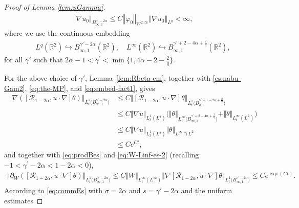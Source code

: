 \documentclass[reqno,11pt,a4paper]{amsart}
\begin{document}
\begin{proof}[Proof of Lemma \ref{lem:pGamma}]
\begin{align*}
  \left\Vert \nabla u_0\right\Vert _{ B_{\infty, 1}^{\gamma^{\prime}-2\alpha}}
  \leq C\left\Vert \varphi_0\right\Vert _{W^{2, \infty}}\left\Vert \nabla u_0\right\Vert _{L^q} <\infty,
\end{align*}
where we use the continuous embedding
\begin{align}\label{eq:embed-fact1}
  L^q(\mathbb{R}^2)\hookrightarrow B^{\gamma'-2\alpha}_{\infty,1}(\mathbb{R}^2),\quad
  L^\infty(\mathbb{R}^2)\hookrightarrow B^{\gamma'+2-4\alpha + \frac{2}{q}}_{\infty,1}(\mathbb{R}^2),
\end{align}
for all $\gamma'$ such that  $2\alpha-1<\gamma^{\prime}<
\min\{1,4\alpha-2-\frac{2}{q}\}$. 

For the above choice of $\gamma'$, Lemma~\ref{lem:Rbeta-cm},
together with \eqref{es:nabu-Gam2}, \eqref{eq:the-MP},
and \eqref{eq:embed-fact1}, gives
\begin{align}\label{eq:R-comm-Bes1}
  \left\Vert \nabla\left(\left[\mathcal{R}_{1-2\alpha}, u \cdot \nabla\right] \theta\right)
  \right\Vert _{L^1_t\big(B_{\infty, 1}^{\gamma^{\prime}-2\alpha}\big)}
  &\leq C \left\Vert \left[\mathcal{R}_{1-2\alpha}, u \cdot \nabla\right] \theta
  \right\Vert _{L^1_t\big(B_{q, 1}^{\gamma^{\prime}+1-2\alpha+\frac{2}{q}}\big)} \nonumber \\
  &\leq C\Vert \nabla u\Vert _{L^1_t(L^q)}\Big(
  \Vert \theta\Vert _{L^\infty_t\big(B^{\gamma^{\prime}+ 2-4\alpha+\frac{2}{q}}_{\infty,1}\big)}
  +\Vert \theta\Vert _{L^\infty_t(L^2)}\Big) \nonumber \\
  &\leq C \Vert \nabla u\Vert _{L^1_t(L^q)} \Vert \theta\Vert _{L^\infty\cap L^2} \\
  &\leq C e^{Ct}, 
\end{align}
and together with \eqref{eq:prodBes} and \eqref{eq:W-Linf-es-2} (recalling $-1<\gamma^{\prime}-2\alpha<1-2\alpha<0$),
\begin{align*}
  \left\Vert \partial_W\left(\left[\mathcal{R}_{1-2\alpha}, u \cdot \nabla\right] \theta\right)
  \right\Vert _{L^1_t\big(B_{\infty, 1}^{\gamma^{\prime}-2\alpha}\big)}
  \leq C\Vert W\Vert _{L^\infty_t(L^\infty)} \left\Vert \nabla\left[\mathcal{R}_{1-2\alpha}, u \cdot \nabla\right] \theta\right\Vert _{L^1_t\big(B_{\infty, 1}^{\gamma^{\prime}-2\alpha}\big)} 
  \leq C e^{\exp(Ct)} .
\end{align*}
According to \eqref{eq:commEs} with $\sigma =2\alpha$ and $s = \gamma'-2\alpha$ and the uniform estimates  

\end{proof}
\end{document}
